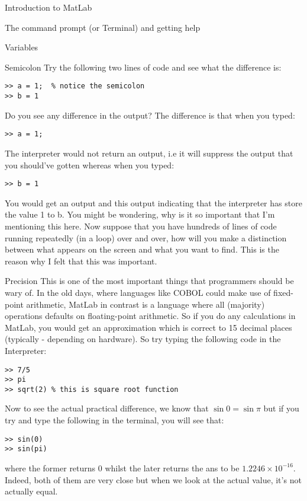 \documentclass[11pt, oneside]{report}   	%
\begin{document}
\begin{chapter}{Introduction to MatLab}
\begin{section}{The command prompt (or Terminal) and getting help}
\begin{subsection}{Variables}
\end{subsection}

\begin{subsection}{Semicolon}
Try the following two lines of code and see what the difference is:

\begin{lstlisting}
>> a = 1;  % notice the semicolon
>> b = 1
\end{lstlisting}
Do you see any difference in the output? The difference is that when you typed:

\begin{lstlisting}
>> a = 1;
\end{lstlisting}
The interpreter would not return an output, i.e it will suppress the output that you should've gotten whereas when you typed:
\begin{lstlisting}
>> b = 1
\end{lstlisting}
You would get an output and this output indicating that the interpreter has store the value 1 to b. You might be wondering, why is it so important that I'm mentioning this here.
Now suppose that you have hundreds of lines of code running repeatedly (in a loop) over and over, how will you make a distinction between what appears on the screen and what you want to find. This is the reason why I felt that this was important. 

\end{subsection}

\begin{subsection}{Precision}
This is one of the most important things that programmers should be wary of. In the old days, where languages like COBOL could make use of fixed-point arithmetic, MatLab in contrast is a language where all (majority) operations defaults on floating-point arithmetic. So if you do any calculations in MatLab, you would get an approximation which is correct to 15 decimal places (typically - depending on hardware). So try typing the following code in the Interpreter:

\begin{lstlisting}
>> 7/5
>> pi
>> sqrt(2) % this is square root function
\end{lstlisting}
Now to see the actual practical difference, we know that $\sin{0} = \sin{\pi}$ but if you try and type the following in the terminal, you will see that:

\begin{lstlisting}
>> sin(0)
>> sin(pi)
\end{lstlisting}
where the former returns $0$ whilst the later returns the ans to be $1.2246 \times 10^{-16}$. Indeed, both of them are very close but when we look at the actual value, it's not actually equal.


\end{subsection}
\end{section}
\end{chapter}
\end{document}
